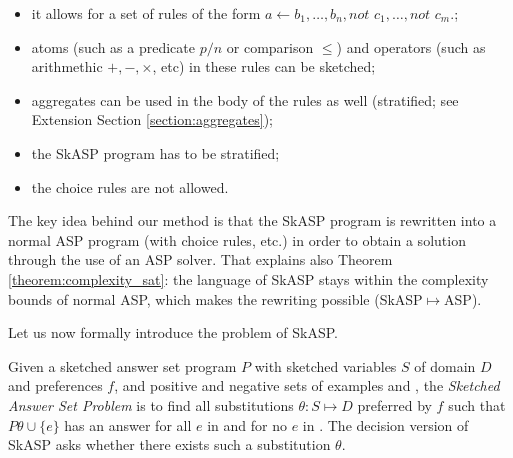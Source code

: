 \begin{itemize}
\item it allows for a set of rules of the form $a \leftarrow b_1, \dots, b_n, \textit{not }c_1, \dots, \textit{not }c_m.$;
\item atoms (such as a predicate $p/n$ or comparison $\leq$) and operators (such as arithmethic $+,-,\times$, etc) in these rules can be sketched; 
\item aggregates can be used in the body of the rules as well (stratified; see Extension Section \ref{section:aggregates});
\item the SkASP program has to be stratified; 
\item the choice rules are not allowed.
\end{itemize}

The key idea behind our method is that the SkASP program is rewritten into a normal ASP program (with choice rules, etc.) in order to obtain a solution through the use of an ASP solver.
That explains also Theorem \ref{theorem:complexity_sat}: the language of SkASP stays within the complexity bounds of normal ASP, which makes the rewriting possible (SkASP$\mapsto$ASP).

Let us now formally introduce the problem of SkASP.
\begin{definition}
  Given  a sketched answer set program $P$ with sketched variables $S$ of domain $D$ and preferences $f$, and positive and negative sets of examples \eplus and \eminus, the \emph{Sketched Answer Set Problem} is to find all substitutions $\theta:S\mapsto D$ preferred by $f$ such that $P\theta \cup \{e\}$ has an answer for all $e$ in \eplus and for no $e$ in \eminus. 
%
The decision version 
of SkASP  asks whether there exists such a substitution $\theta$.
\end{definition}

